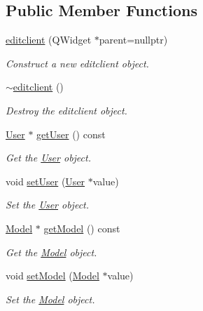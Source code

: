\subsection*{Public Member Functions}
\begin{DoxyCompactItemize}
\item 
\hyperlink{classeditclient_a5ea13813becddce68bcda899fbf7bad1}{editclient} (Q\+Widget $\ast$parent=nullptr)
\begin{DoxyCompactList}\small\item\em Construct a new editclient object. \end{DoxyCompactList}\item 
\hyperlink{classeditclient_ac881d2dd9b89bfec7632f85efe967d21}{$\sim$editclient} ()
\begin{DoxyCompactList}\small\item\em Destroy the editclient object. \end{DoxyCompactList}\item 
\hyperlink{classUser}{User} $\ast$ \hyperlink{classeditclient_ae9f2a67e859a01828e321ef86631afaf}{get\+User} () const
\begin{DoxyCompactList}\small\item\em Get the \hyperlink{classUser}{User} object. \end{DoxyCompactList}\item 
void \hyperlink{classeditclient_acc61aaf32845af5f061c565e15ee14cc}{set\+User} (\hyperlink{classUser}{User} $\ast$value)
\begin{DoxyCompactList}\small\item\em Set the \hyperlink{classUser}{User} object. \end{DoxyCompactList}\item 
\hyperlink{classModel}{Model} $\ast$ \hyperlink{classeditclient_a134cd4aaa1c6dcef1a1c4455569bf51d}{get\+Model} () const
\begin{DoxyCompactList}\small\item\em Get the \hyperlink{classModel}{Model} object. \end{DoxyCompactList}\item 
void \hyperlink{classeditclient_a70e9ccebb55d8683339c90eb2eef1107}{set\+Model} (\hyperlink{classModel}{Model} $\ast$value)
\begin{DoxyCompactList}\small\item\em Set the \hyperlink{classModel}{Model} object. \end{DoxyCompactList}\end{DoxyCompactItemize}
